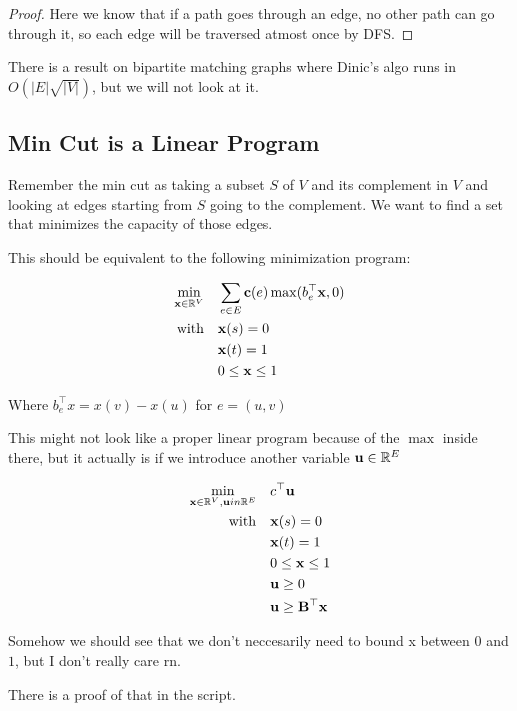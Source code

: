 \begin{proof}
    Here we know that if a path goes through an edge, no other path can go through it, so each edge will be traversed atmost once by DFS.
\end{proof}

There is a result on bipartite matching graphs where Dinic's algo runs in $O(|E| \sqrt{|V|})$, but we will not look at it.


\subsection{Min Cut is a Linear Program}

Remember the min cut as taking a subset $S$ of $V$ and its complement in $V$ and looking at edges starting from $S$ going to the complement. We want to find a set that minimizes the capacity of those edges.

This should be equivalent to the following minimization program:

\begin{equation}
    \begin{aligned}
    \min _{\mathbf{x}\in \mathbb{R}^V} &  \quad \sum_{e\in E} \mathbf{c} (e) \max(b_e ^\top \mathbf{x}, 0)\\
    \text{with} & \quad  \mathbf{x}(s) = 0\\
    & \quad \mathbf{x}(t) = 1 \\
    & \quad 0 \leq \mathbf{x} \leq 1
\end{aligned}
\end{equation}

Where $b_e^\top x = x(v) - x(u)$ for $e = (u,v)$

This might not look like a proper linear program because of the $\max$ inside there, but it actually is if we introduce another variable $\mathbf{u} \in \mathbb{R}^E$

\begin{equation}
    \begin{aligned}
    \min _{\mathbf{x}\in \mathbb{R}^V, \mathbf{u} in \mathbb{R}^E} &  \quad c^\top \mathbf{u}\\
    \text{with} & \quad  \mathbf{x}(s) = 0\\
    & \quad \mathbf{x}(t) = 1 \\
    & \quad 0 \leq \mathbf{x} \leq 1\\
    & \quad \mathbf{u} \geq 0\\
    & \quad \mathbf{u} \geq \mathbf{B^\top x}
\end{aligned}
\end{equation}

Somehow we should see that we don't neccesarily need to bound x between $0$ and $1$, but I don't really care rn.

There is a proof of that in the script.